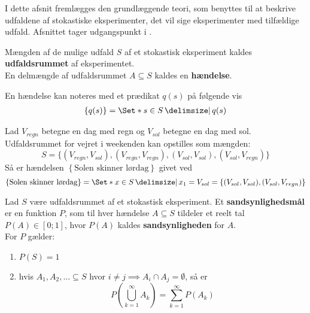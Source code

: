 I dette afsnit fremlægges den grundlæggende teori, som benyttes til at beskrive udfaldene af stokastiske eksperimenter, det vil sige eksperimenter med tilfældige udfald. Afsnittet tager udgangspunkt i \cite{sandsynlighedsBog}.
\begin{defn}
Mængden af de mulige udfald $S$ af et stokastisk eksperiment kaldes \textbf{udfaldsrummet} af eksperimentet.\\
En delmængde af udfaldsrummet $A\subseteq S$ kaldes en \textbf{hændelse}.
\end{defn}

En hændelse kan noteres med et prædikat $q(s)$ på følgende vis
\begin{align*}
    \left\{q(s)\right\} = \Set*{s\in S\given q(s)}
\end{align*}
\begin{exmp}
Lad $V_{regn}$ betegne en dag med regn og $V_{sol}$ betegne en dag med sol. Udfaldsrummet for vejret i weekenden kan opstilles som mængden:
\begin{equation*}
    S = \{(V_{regn}, V_{sol}), (V_{regn}, V_{regn}), (V_{sol}, V_{sol}), (V_{sol}, V_{regn})\}
\end{equation*}
Så er hændelsen $\left\{\text{Solen skinner lørdag}\right\}$ givet ved
\begin{equation*}
    \left\{\text{Solen skinner lørdag}\right\} = \Set*{x \in S \given x_1 = V_{sol}} = \left\{(V_{sol}, V_{sol}), (V_{sol}, V_{regn})\right\}%
\end{equation*}
\end{exmp}

\begin{definition}  \label{def:axiomsOfPropability}
Lad $S$ være udfaldsrummet af et stokastisk eksperiment.
Et \textbf{sandsynlighedsmål} er en funktion $P$, som til hver hændelse $A \subseteq S$ tildeler et reelt tal $P(A) \in [0; 1]$, hvor $P(A)$ kaldes \textbf{sandsynligheden} for $A$. \\
For $P$ gælder:
\begin{enumerate}
    \item $P(S)=1$
    \item hvis $A_1,A_2,\ldots\subseteq S$ hvor $i \neq j \implies A_i\cap A_j=\emptyset$, så er 
    \begin{equation*}
        P\left(\bigcup_{k=1}^\infty A_k\right)=\sum_{k=1}^\infty P(A_k)
    \end{equation*} \label{enu:axiomsOfPropability2}
\end{enumerate}
\end{definition}

